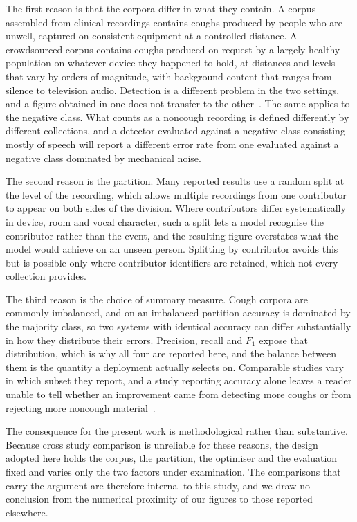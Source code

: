 \documentclass[pdflatex,sn-mathphys-num]{sn-jnl}
\begin{document}
The first reason is that the corpora differ in what they contain. A corpus
assembled from clinical recordings contains coughs produced by people who are
unwell, captured on consistent equipment at a controlled distance. A
crowdsourced corpus contains coughs produced on request by a largely healthy
population on whatever device they happened to hold, at distances and levels
that vary by orders of magnitude, with background content that ranges from
silence to television audio. Detection is a different problem in the two
settings, and a figure obtained in one does not transfer to the
other~\cite{orlandic2021, ijaz2022}. The same applies to the negative class.
What counts as a noncough recording is defined differently by different
collections, and a detector evaluated against a negative class consisting
mostly of speech will report a different error rate from one evaluated
against a negative class dominated by mechanical noise.

The second reason is the partition. Many reported results use a random split
at the level of the recording, which allows multiple recordings from one
contributor to appear on both sides of the division. Where contributors
differ systematically in device, room and vocal character, such a split lets
a model recognise the contributor rather than the event, and the resulting
figure overstates what the model would achieve on an unseen person. Splitting
by contributor avoids this but is possible only where contributor identifiers
are retained, which not every collection provides.

The third reason is the choice of summary measure. Cough corpora are commonly
imbalanced, and on an imbalanced partition accuracy is dominated by the
majority class, so two systems with identical accuracy can differ
substantially in how they distribute their errors. Precision, recall and
$F_1$ expose that distribution, which is why all four are reported here,
and the balance between them is the quantity a deployment actually
selects on. Comparable studies vary in which subset they report, and a study
reporting accuracy alone leaves a reader unable to tell whether an
improvement came from detecting more coughs or from rejecting more noncough
material~\cite{son2022}.

The consequence for the present work is methodological rather than
substantive. Because cross study comparison is unreliable for these reasons,
the design adopted here holds the corpus, the partition, the optimiser and the
evaluation fixed and varies only the two factors under examination. The
comparisons that carry the argument are therefore internal to this study, and
we draw no conclusion from the numerical proximity of our figures to those
reported elsewhere.
\end{document}
